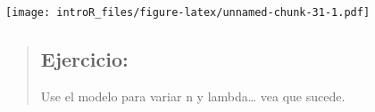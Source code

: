 \documentclass[
]{book}
\begin{document}
\texttt{[image: introR\_files/figure-latex/unnamed-chunk-31-1.pdf]}

\begin{quote}
\hypertarget{ejercicio-7}{%
\subsection{Ejercicio:}\label{ejercicio-7}}

Use el modelo para variar n y lambda\ldots{} vea que sucede.
\end{quote}

  
\end{document}
